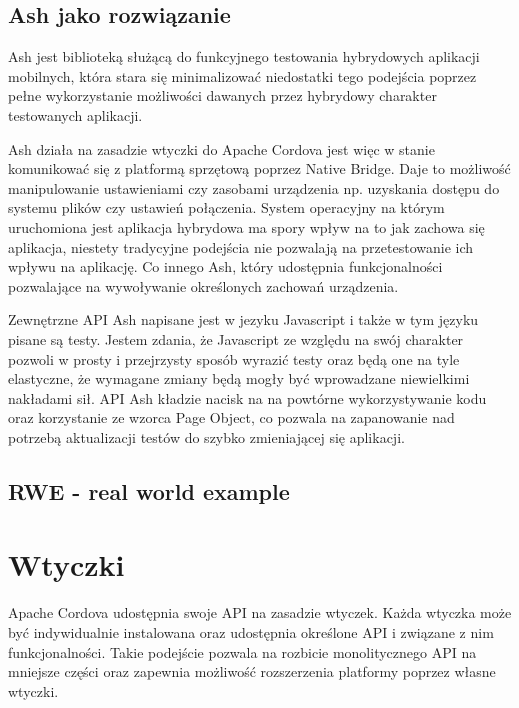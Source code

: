 \documentclass[brudnopis]{xmgr}
\begin{document}
                                                                                                                                                                 
\section{Ash jako rozwiązanie}

Ash jest biblioteką służącą do funkcyjnego testowania hybrydowych aplikacji mobilnych, która stara się minimalizować niedostatki tego podejścia poprzez pełne wykorzystanie możliwości dawanych przez hybrydowy charakter testowanych aplikacji. 

Ash działa na zasadzie wtyczki do Apache Cordova jest więc w stanie komunikować się z platformą sprzętową poprzez Native Bridge. Daje to możliwość manipulowanie ustawieniami czy zasobami urządzenia np. uzyskania dostępu do systemu plików czy ustawień połączenia. System operacyjny na którym uruchomiona jest aplikacja hybrydowa ma spory wpływ na to jak zachowa się aplikacja, niestety tradycyjne podejścia nie pozwalają na przetestowanie ich wpływu na aplikację. Co innego Ash, który udostępnia funkcjonalności pozwalające na wywoływanie określonych zachowań urządzenia. 

Zewnętrzne API Ash napisane jest w jezyku Javascript i także w tym języku pisane są testy. Jestem zdania, że Javascript ze względu na swój charakter pozwoli w prosty i przejrzysty sposób wyrazić testy oraz będą one na tyle elastyczne, że wymagane zmiany będą mogły być wprowadzane niewielkimi nakładami sił. API Ash kładzie nacisk na na powtórne wykorzystywanie kodu oraz korzystanie ze wzorca Page Object, co pozwala na zapanowanie nad potrzebą aktualizacji testów do szybko zmieniającej się aplikacji. 

\section{RWE - real world example}

\chapter{Wtyczki}

Apache Cordova udostępnia swoje API na zasadzie wtyczek. Każda wtyczka może być indywidualnie instalowana oraz udostępnia określone API i związane z nim funkcjonalności. Takie podejście pozwala na rozbicie monolitycznego API na mniejsze części oraz zapewnia możliwość rozszerzenia platformy poprzez własne wtyczki.
\end{document}
